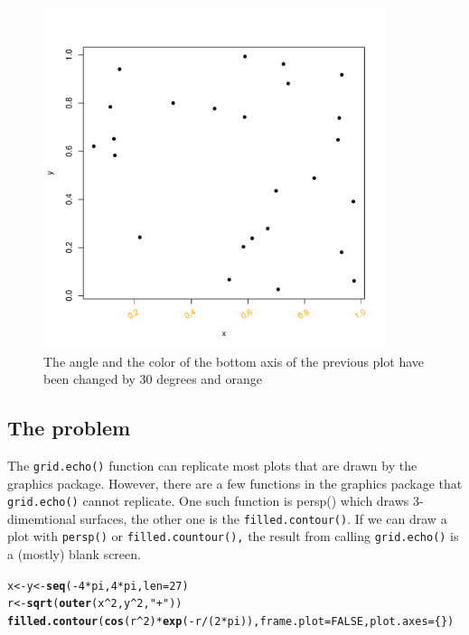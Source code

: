 \documentclass[a4paper,10pt]{article}\usepackage[]{graphicx}\usepackage[]{color}
\makeatletter
\newcommand{\hlnum}[1]{\textcolor[rgb]{0.686,0.059,0.569}{#1}}%
\newcommand{\hlstr}[1]{\textcolor[rgb]{0.192,0.494,0.8}{#1}}%
\newcommand{\hlopt}[1]{\textcolor[rgb]{0,0,0}{#1}}%
\newcommand{\hlstd}[1]{\textcolor[rgb]{0.345,0.345,0.345}{#1}}%
\newcommand{\hlkwb}[1]{\textcolor[rgb]{0.69,0.353,0.396}{#1}}%
\newcommand{\hlkwc}[1]{\textcolor[rgb]{0.333,0.667,0.333}{#1}}%
\newcommand{\hlkwd}[1]{\textcolor[rgb]{0.737,0.353,0.396}{\textbf{#1}}}%
\newenvironment{kframe}{%
 \def\at@end@of@kframe{}%
 \ifinner\ifhmode%
  \def\at@end@of@kframe{\end{minipage}}%
  \begin{minipage}{\columnwidth}%
 \fi\fi%
 \def\FrameCommand##1{\hskip\@totalleftmargin \hskip-\fboxsep
 \colorbox{shadecolor}{##1}\hskip-\fboxsep
     \hskip-\linewidth \hskip-\@totalleftmargin \hskip\columnwidth}%
 \MakeFramed {\advance\hsize-\width
   \@totalleftmargin\z@ \linewidth\hsize
   \@setminipage}}%
 {\par\unskip\endMakeFramed%
 \at@end@of@kframe}
\newenvironment{knitrout}{}{} %
\makeatother
\begin{document}
\begin{figure}[h]
\begin{center}
  \includegraphics[height = 10cm, width = 10cm]{figure/gridedit.pdf}
  \caption{The angle and the color of the bottom axis of the previous plot have been changed by 30 degrees and orange}
  	\label{figure3}
\end{center}
\end{figure}


\subsection{The problem}
The \texttt{grid.echo()} function can replicate most plots that are drawn by the graphics package. However, there are a few functions in the graphics package that \texttt{grid.echo()} cannot replicate. One such function is persp() which draws 3-dimemtional surfaces, the other one is the \texttt{filled.contour()}. If we can draw a plot with \texttt{persp()} or \texttt{filled.countour(),} the result from calling \texttt{grid.echo()} is a (mostly) blank screen. 

\begin{knitrout}
\color{fgcolor}\begin{kframe}
\begin{alltt}
\hlstd{x} \hlkwb{<-} \hlstd{y} \hlkwb{<-} \hlkwd{seq}\hlstd{(}\hlopt{-}\hlnum{4}\hlopt{*}\hlstd{pi,} \hlnum{4}\hlopt{*}\hlstd{pi,} \hlkwc{len} \hlstd{=} \hlnum{27}\hlstd{)}
\hlstd{r} \hlkwb{<-} \hlkwd{sqrt}\hlstd{(}\hlkwd{outer}\hlstd{(x}\hlopt{^}\hlnum{2}\hlstd{, y}\hlopt{^}\hlnum{2}\hlstd{,} \hlstr{"+"}\hlstd{))}
\hlkwd{filled.contour}\hlstd{(}\hlkwd{cos}\hlstd{(r}\hlopt{^}\hlnum{2}\hlstd{)}\hlopt{*}\hlkwd{exp}\hlstd{(}\hlopt{-}\hlstd{r}\hlopt{/}\hlstd{(}\hlnum{2}\hlopt{*}\hlstd{pi)),} \hlkwc{frame.plot} \hlstd{=} \hlnum{FALSE}\hlstd{,} \hlkwc{plot.axes} \hlstd{= \{\})}
\end{alltt}
\end{kframe}
\end{knitrout}
\end{document}
